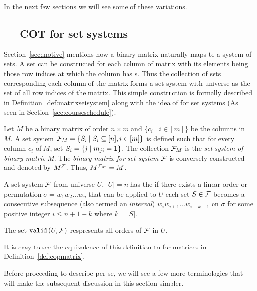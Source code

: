 In the next few sections we will see some of these variations.


\subsection{\PQRtree\ --  COT for set systems}
\label{sec:surveycertalgo}

Section~\ref{sec:motive} mentions how a binary matrix naturally maps
to a system of sets.  A set can be constructed for each column of
matrix with its elements being those row indices at which the column
has \un s. Thus the collection of sets corresponding each column of
the matrix forms a set system with universe as the set of all row
indices of the matrix.  This simple construction is formally described
in Definition~\ref{def:matrixsetsystem} along with the idea of \cop
for set systems (As seen in Section~\ref{sec:courseschedule}).

\begin{definition}%
  \label{def:matrixsetsystem}%
  Let $M$ be a binary matrix of order $n \times m$ and $\{c_i \mid i
  \in [m]\}$ be the columns in $M$.  A set system ${\cal F}_{M} = \{S_i
  \mid S_i \subseteq [n], i \in [m]\}$ is defined such that for every
  column $c_i$ of $M$, set $S_i = \{j \mid m_{ji} = \textbf{1} \}$. The
  collection ${\cal F}_M$ is the {\em set system of binary matrix} $M$. The
  {\em binary matrix for set system} ${\cal F}$ is conversely constructed
  and denoted by $M^{\cal F}$. Thus, $M^{{\cal F}_M} = M$.%
  \par\noindent%
  A set system ${\cal F}$ from universe $U$, $|U| = n$ has the {\em \cop}
  if there exists a linear order or permutation $\sigma = w_1w_2\ldots
  w_n$ that can be applied to $U$ \stt each set $S \in {\cal F}$ becomes a
  consecutive subsequence (also termed an {\em interval})
  $w_{i}w_{i+1}\ldots w_{i+k-1}$ on $\sigma$ for some positive integer
  $i \le n+1-k$ where $k = |S|$.
  \par\noindent%
  The set ${\tt valid}\left(U,{\cal F}\right)$ respresents all \COP orders of ${\cal F}$ in $U$.
  \dstop
\end{definition}

It is easy to see the equivalence of this definition to \COP for
matrices in Definition~\ref{def:copmatrix}.

Before proceeding to describe \PQRtree per se, we will see a few more
terminologies that will make the subsequent discussion in this section
simpler.

